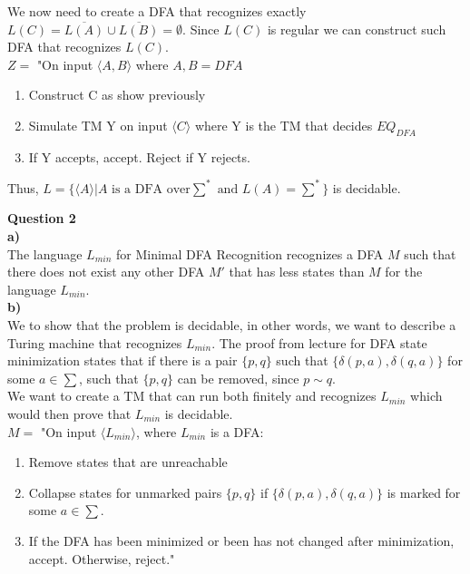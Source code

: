 \documentclass{article}
\begin{document}
We now need to create a DFA that recognizes exactly $L(C) = \overline{L(A)} \cup \overline{L(B)} = \emptyset$. Since $L(C)$ is regular we can construct such DFA that recognizes $L(C)$.\\

$Z=$ "On input $\langle A,B \rangle$ where $A,B=DFA$
\begin{enumerate}
  \item Construct C as show previously 
  \item Simulate TM Y on input $\langle C \rangle$ where Y is the TM that decides $EQ_{DFA}$
  \item If Y accepts, accept. Reject if Y rejects.
\end{enumerate}

Thus, $L = \{ \langle A \rangle | A \text{ is a DFA over} \sum^* \text{ and } L(A) = \sum^* \}$ is decidable.

\break
{\bf Question 2}\\
{\bf a)}\\
The language $L_{min}$ for Minimal DFA Recognition recognizes a DFA $M$ such that there does not exist any other DFA $M'$ that has less states than $M$ for the language $L_{min}$.\\

{\bf b)}\\
We to show that the problem is decidable, in other words, we want to describe a Turing machine that recognizes $L_{min}$. The proof from lecture for DFA state minimization states that if there is a pair $\{p, q\}$ such that $\{\delta(p,a),\delta(q,a)\}$ for some $a \in \sum$, such that $\{p, q\}$ can be removed, since $p \sim q$.\\

We want to create a TM that can run both finitely and recognizes $L_{min}$ which would then prove that $L_{min}$ is decidable.\\

$M =$ "On input $\langle L_{min} \rangle$, where $L_{min}$ is a DFA:
\begin{enumerate}
  \item Remove states that are unreachable
  \item Collapse states for unmarked pairs $\{p, q\}$ if $\{\delta(p,a),\delta(q,a)\}$  is marked for some $a \in \sum$.
  \item If the DFA has been minimized or been has not changed after minimization, accept. Otherwise, reject."
\end{enumerate}
\end{document}
